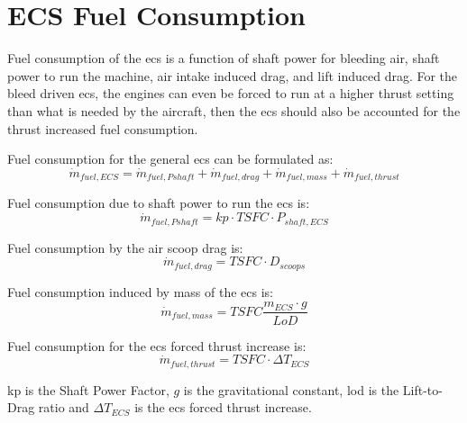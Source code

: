 \documentclass[english]{kththesis}
\begin{document}
\section{ECS Fuel Consumption}
\label{sec:ECSFuelConsumption}


Fuel consumption of the \acrshort{ecs} is a function of shaft power for bleeding air, shaft power to run the machine, air intake induced drag, and lift induced drag. For the bleed driven \acrshort{ecs}, the engines can even be forced to run at a higher thrust setting than what is needed by the aircraft, then the \acrshort{ecs} should also be accounted for the thrust increased fuel consumption.


Fuel consumption for the general \acrshort{ecs} can be formulated as:
\begin{equation}
\label{ECSFuel}
\dot{m}_{fuel,ECS} = \dot{m}_{fuel,Pshaft} + \dot{m}_{fuel,drag} + \dot{m}_{fuel,mass} + \dot{m}_{fuel,thrust}
\end{equation}

Fuel consumption due to shaft power to run the \acrshort{ecs} is:
\begin{equation}
\label{ECSFuelshaft}
\dot{m}_{fuel,Pshaft} = kp\cdot TSFC \cdot P_{shaft,ECS}
\end{equation}

Fuel consumption by the air scoop drag is:
\begin{equation}
\label{ECSFueldrag}
\dot{m}_{fuel,drag} = TSFC \cdot D_{scoops}
\end{equation}

Fuel consumption induced by mass of the \acrshort{ecs} is:
\begin{equation}
\label{ECSFuelmass}
\dot{m}_{fuel,mass} = TSFC \frac{m_{ECS}\cdot g}{LoD}
\end{equation}

Fuel consumption for the \acrshort{ecs} forced thrust increase is:
\begin{equation}
\label{ECSFuelthrust}
\dot{m}_{fuel,thrust} = TSFC \cdot \Delta T_{ECS}
\end{equation}


\acrshort{kp} is the Shaft Power Factor, $g$ is the gravitational constant, \acrshort{lod} is the Lift-to-Drag ratio and $\Delta T_{ECS}$ is the \acrshort{ecs} forced thrust increase.\\
\end{document}
